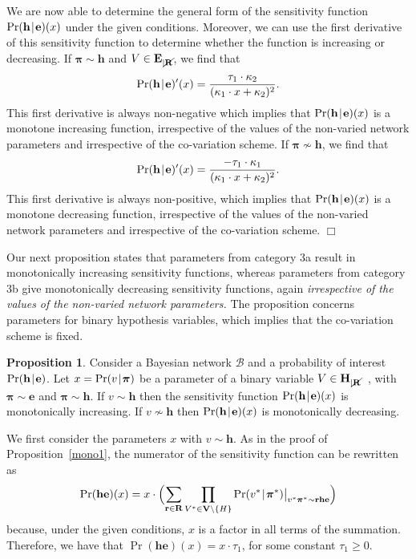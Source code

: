 \documentclass[10pt,a4paper]{paper}
\theoremstyle{definition}
\newtheorem{prop}[theorem]{Proposition}
\newcommand{\bpi}{\boldsymbol\pi}
\newcommand{\vbpi}{\boldsymbol\pi}
\newcommand{\ct}[1]{\tau_{#1}}
\newcommand{\cn}[1]{\kappa_{#1}}
\newcommand{\hyp}{\mathbf{h}}
\newcommand{\ev}{\mathbf{e}}
\newcommand{\hyps}{\mathbf{H}}
\newcommand{\evs}{\mathbf{E}}
\newcommand{\restr}{_{|\cancel{\bf R}}}
\newcommand{\giv}[1]{\big\vert_{#1}}
\newcommand{\cd}{\!\cdot\!}
\newcommand{\newmid}{\hspace{0.9pt}\vert\hspace{0.9pt}}
\begin{document}
We are now able to determine the general form of the sensitivity function $\Pr(\hyp\newmid\ev)(x)$ under the given conditions.
Moreover, we can use the first derivative of this sensitivity function to determine whether the function is increasing or decreasing.
If $\bpi\sim\hyp $ and $V \in \evs\restr$, we find that
\begin{equation*}
\Pr(\hyp\newmid\ev)'(x)=\frac{\ct{1}\cdot \cn{2}}{(\cn{1}\cdot x+\cn{2})^2}.
\end{equation*}
This first derivative is always non-negative which implies that $\Pr(\hyp\newmid \ev)(x)$ is a monotone increasing function, irrespective of the values of the non-varied network parameters and irrespective of the co-variation scheme. 
If $\bpi\nsim\hyp$, we find that
\begin{equation*}
\Pr(\hyp\newmid\ev)'(x)=\frac{-\ct{1}\cdot \cn{1}}{(\cn{1}\cdot x+\cn{2})^2}.
\end{equation*}
This first derivative is always non-positive, which implies that $\Pr(\hyp\newmid \ev)(x)$ is a monotone decreasing function, irrespective of the values of the non-varied network parameters and irrespective of the co-variation scheme. 
\hfill $\Box$

\bigskip

Our next proposition states that parameters from category 3a result in monotonically increasing sensitivity functions, whereas parameters from category 3b give monotonically decreasing sensitivity functions, again \emph{irrespective of the values of the non-varied network parameters.}  The proposition concerns parameters for binary hypothesis variables, which implies that the co-variation scheme is fixed. 

\begin{prop}\label{mono2}
Consider a Bayesian network ${\mathcal B}$ 
and a probability of interest $\Pr(\hyp\newmid \ev)$. 
Let $x=\Pr(v\newmid \bpi)$ be a parameter of a binary variable $V\in\hyps\restr$~, with $\bpi\sim\ev$ and $\bpi\sim\hyp$. If\/ $v\sim\hyp$ then the sensitivity function $\Pr(\hyp\newmid \ev)(x)$ is monotonically increasing. If\/ $v\nsim\hyp$ then 
$\Pr(\hyp\newmid \ev)(x)$ is monotonically decreasing.
\end{prop}

We first consider the parameters $x$ with $v\sim \hyp$.
As in the proof of Proposition~\ref{mono1}, the numerator of the sensitivity function can be rewritten as
\[\Pr(\hyp\ev)(x)= x\cdot 
\Bigl(
\sum_{{\bf r}\in{\bf R}} \prod_{V^*\in {\bf V}\setminus\{H\}} \Pr(v^* \newmid \vbpi^*)\giv{v^*\vbpi^*\sim {\bf r}\hyp\ev} 
\Bigr)
\]
because, under the given conditions, $x$ is a factor in all terms of the summation. Therefore, we have that $\Pr(\hyp\ev)(x) = x\cd\ct{1}$, for some constant $\ct{1} \geq 0$. 
\end{document}
